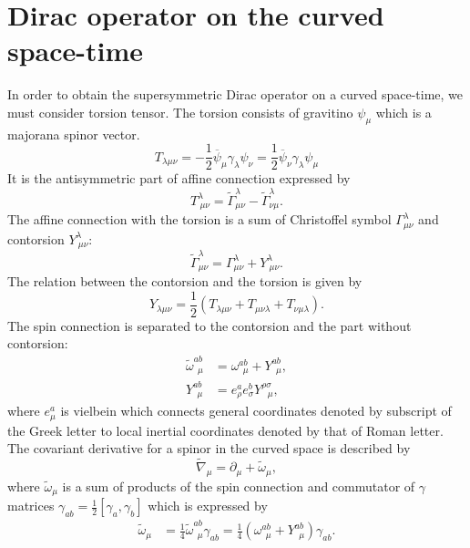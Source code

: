 \documentclass{ptephy}%
\newcommand{\ovl}{\overline}
\begin{document}
\section{Dirac operator on the curved space-time}
In order to obtain the supersymmetric Dirac operator on a curved space-time, 
we must consider torsion tensor.  
The torsion consists of gravitino $\psi_\mu$ which is a majorana spinor vector.   
\begin{equation}
T_{\lambda\mu\nu}=-\frac{1}{2}\ovl{\psi}_\mu\gamma_\lambda\psi_\nu=\frac{1}{2}\ovl{\psi}_\nu\gamma_\lambda\psi_\mu
\end{equation}
It is the antisymmetric part of affine connection expressed by 
\begin{equation}
T^\lambda_{\ \mu\nu}=\tilde{\Gamma}^\lambda_{\mu\nu}-\tilde{\Gamma}^\lambda_{\nu\mu}.
\end{equation}
The affine connection with the torsion is a sum of Christoffel symbol $\Gamma^\lambda_{\mu\nu}$ 
and contorsion $Y^\lambda_{\ \mu\nu}$:
\begin{equation}
\tilde{\Gamma}^\lambda_{\mu\nu}=\Gamma^\lambda_{\mu\nu}+Y^\lambda_{\ \mu\nu}.
\end{equation} 
The relation between the contorsion and the torsion is given by
\begin{equation}
Y_{\lambda\mu\nu} =\frac{1}{2}(T_{\lambda\mu\nu}+T_{\mu\nu\lambda}+T_{\nu\mu\lambda}).
\end{equation} 
The spin connection is separated to the contorsion and the part without contorsion\cite{Lopez}:
\begin{align}
\tilde{\omega}^{ab}_{\ \ \mu} & =\omega^{ab}_{\ \ \mu}+Y^{ab}_{\ \ \mu}, \\
Y^{ab}_{\ \ \mu} & = e^a_\rho e^b_\sigma Y^{\rho\sigma}_{\ \ \ \mu},
\end{align} 
where $e^a_\mu$ is vielbein which connects general coordinates denoted by subscript of the Greek letter 
to local inertial coordinates denoted by that of Roman letter. 
The covariant derivative for a spinor in the curved space is described by
\begin{equation}
\tilde{\nabla}_\mu =\partial_\mu+\tilde{\omega}_\mu, \label{coderivative1}
\end{equation}  
where  $\tilde{\omega}_\mu$ is a sum of products of the spin connection and commutator of $\gamma$ matrices 
$\gamma_{ab}=\frac{1}{2}[\gamma_a,\gamma_b] $ which is expressed by
\begin{align}
\tilde{\omega}_\mu & = \frac{1}{4}\tilde{\omega}^{ab}_{\ \ \mu}\gamma_{ab}
=\frac{1}{4}(\omega^{ab}_{\ \ \mu}+Y^{ab}_{\ \ \mu})\gamma_{ab}.
\end{align}
\end{document}
